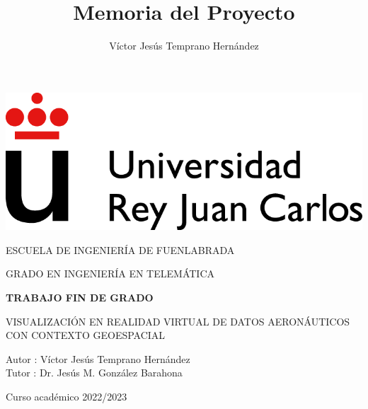 \documentclass[a4paper, 11pt]{book}
\title{Memoria del Proyecto}
\author{Víctor Jesús Temprano Hernández}
\begin{document}
\renewcommand{\refname}{Bibliografía}  %
\renewcommand{\appendixname}{Apéndice}



\begin{titlepage}
\begin{center}
\includegraphics[scale=0.6]{img/URJ_logo_Color_POS.png}

\vspace{1.75cm}

\LARGE
ESCUELA DE INGENIERÍA DE FUENLABRADA
\vspace{1cm}

\LARGE
GRADO EN INGENIERÍA EN TELEMÁTICA

\vspace{1cm}
\LARGE
\textbf{TRABAJO FIN DE GRADO}

\vspace{2cm}

\Large
VISUALIZACIÓN EN REALIDAD VIRTUAL DE DATOS AERONÁUTICOS
CON CONTEXTO GEOESPACIAL

\vspace{2cm}

\large
Autor : Víctor Jesús Temprano Hernández \\
Tutor : Dr. Jesús M. González Barahona\\
\vspace{1cm}

\large
Curso académico 2022/2023

\end{center}
\end{titlepage}

\newpage
\mbox{}
\thispagestyle{empty} %
\end{document}
